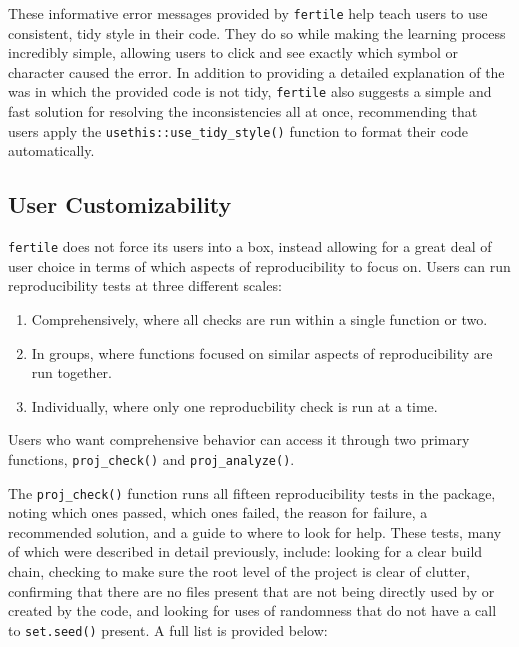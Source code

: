 \documentclass[12pt,twoside]{reedthesis}
\providecommand{\tightlist}{%
  \setlength{\itemsep}{0pt}\setlength{\parskip}{0pt}}
\begin{document}
These informative error messages provided by \texttt{fertile} help teach
users to use consistent, tidy style in their code. They do so while
making the learning process incredibly simple, allowing users to click
and see exactly which symbol or character caused the error. In addition
to providing a detailed explanation of the was in which the provided
code is not tidy, \texttt{fertile} also suggests a simple and fast
solution for resolving the inconsistencies all at once, recommending
that users apply the \texttt{usethis::use\_tidy\_style()} function to
format their code automatically.

\subsection{User Customizability}\label{user-customizability}

\texttt{fertile} does not force its users into a box, instead allowing
for a great deal of user choice in terms of which aspects of
reproducibility to focus on. Users can run reproducibility tests at
three different scales:
\begin{enumerate}
\def\labelenumi{\arabic{enumi})}
\tightlist
\item
  Comprehensively, where all checks are run within a single function or
  two.
\item
  In groups, where functions focused on similar aspects of
  reproducibility are run together.
\item
  Individually, where only one reproducbility check is run at a time.
\end{enumerate}
Users who want comprehensive behavior can access it through two primary
functions, \texttt{proj\_check()} and \texttt{proj\_analyze()}.

The \texttt{proj\_check()} function runs all fifteen reproducibility
tests in the package, noting which ones passed, which ones failed, the
reason for failure, a recommended solution, and a guide to where to look
for help. These tests, many of which were described in detail
previously, include: looking for a clear build chain, checking to make
sure the root level of the project is clear of clutter, confirming that
there are no files present that are not being directly used by or
created by the code, and looking for uses of randomness that do not have
a call to \texttt{set.seed()} present. A full list is provided below:
\end{document}
